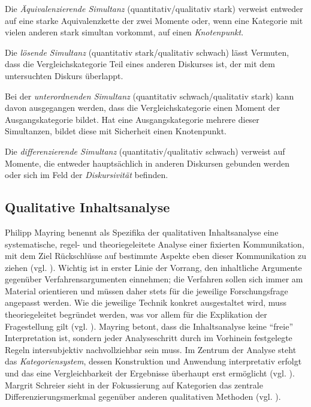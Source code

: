 \documentclass[12pt, titlepage=true, toc=bib]{scrartcl}
\begin{document}
{\noindent Die \textit{Äquivalenzierende Simultanz} (quantitativ/qualitativ stark) verweist entweder auf eine starke Aquivalenzkette der zwei Momente oder, wenn eine Kategorie mit vielen anderen stark simultan vorkommt, auf einen \textit{Knotenpunkt}.

\noindent Die \textit{lösende Simultanz} (quantitativ stark/qualitativ schwach) lässt Vermuten, dass die Vergleichskategorie Teil eines anderen Diskurses ist, der mit dem untersuchten Diskurs überlappt.

\noindent Bei der \textit{unterordnenden Simultanz} (quantitativ schwach/qualitativ stark) kann davon ausgegangen werden, dass die Vergleichskategorie einen Moment der Ausgangskategorie bildet. Hat eine Ausgangskategorie mehrere dieser Simultanzen, bildet diese mit Sicherheit einen Knotenpunkt.

\noindent Die \textit{differenzierende Simultanz} (quantitativ/qualitativ schwach) verweist auf Momente, die entweder hauptsächlich in anderen Diskursen gebunden werden oder sich im Feld der \textit{Diskursivität} befinden.

\subsection{Qualitative Inhaltsanalyse}

Philipp Mayring benennt als Spezifika der qualitativen Inhaltsanalyse eine systematische, regel- und theoriegeleitete Analyse einer fixierten Kommunikation, mit dem Ziel Rückschlüsse auf bestimmte Aspekte eben dieser Kommunikation zu ziehen (vgl. \cite*[13]{mayring_qualitative_2010}). Wichtig ist in erster Linie der Vorrang, den inhaltliche Argumente gegenüber Verfahrensargumenten einnehmen; die Verfahren sollen sich immer am Material orientieren und müssen daher stets für die jeweilige Forschungsfrage angepasst werden. Wie die jeweilige Technik konkret ausgestaltet wird, muss theoriegeleitet begründet werden, was vor allem für die Explikation der Fragestellung gilt (vgl. \cite[50-51]{mayring_qualitative_2010}). Mayring betont, dass die Inhaltsanalyse keine "`freie"' Interpretation ist, sondern jeder Analyseschritt durch im Vorhinein festgelegte Regeln intersubjektiv nachvollziehbar sein muss. Im Zentrum der Analyse steht das \textit{Kategoriensystem}, dessen Konstruktion und Anwendung interpretativ erfolgt und das eine Vergleichbarkeit der Ergebnisse überhaupt erst ermöglicht (vgl. \cite[49]{mayring_qualitative_2010}). Margrit Schreier sieht in der Fokussierung auf Kategorien das zentrale Differenzierungsmerkmal gegenüber anderen qualitativen Methoden (vgl. \cite[3]{schreier_varianten_2014}).

}
\end{document}
